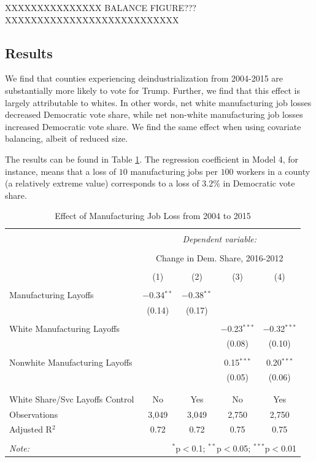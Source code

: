\documentclass[]{AEA}
\begin{document}
XXXXXXXXXXXXXXX BALANCE FIGURE??? XXXXXXXXXXXXXXXXXXXXXXXXXXX

\subsection{Results}

We find that counties experiencing deindustrialization from 2004-2015
are substantially more likely to vote for Trump. Further, we find that
this effect is largely attributable to whites. In other words, net white
manufacturing job losses decreased Democratic vote share, while net
non-white manufacturing job losses increased Democratic vote share. We
find the same effect when using covariate balancing, albeit of reduced
size.

The results can be found in Table \ref{regResult04}. The regression
coefficient in Model 4, for instance, means that a loss of \(10\)
manufacturing jobs per \(100\) workers in a county (a relatively extreme
value) corresponds to a loss of \(3.2 \%\) in Democratic vote share.

\begin{table}[!htbp] \centering 
  \caption{Effect of Manufacturing Job Loss from 2004 to 2015} 
  \label{regResult04} 
\begin{tabular}{@{\extracolsep{5pt}}lcccc} 
\\[-1.8ex]\hline 
\hline \\[-1.8ex] 
 & \multicolumn{4}{c}{\textit{Dependent variable:}} \\ 
\cline{2-5} 
\\[-1.8ex] & \multicolumn{4}{c}{Change in Dem. Share, 2016-2012} \\ 
\\[-1.8ex] & (1) & (2) & (3) & (4)\\ 
\hline \\[-1.8ex] 
 Manufacturing Layoffs & $-$0.34$^{**}$ & $-$0.38$^{**}$ &  &  \\ 
  & (0.14) & (0.17) &  &  \\ 
  & & & & \\ 
 White Manufacturing Layoffs &  &  & $-$0.23$^{***}$ & $-$0.32$^{***}$ \\ 
  &  &  & (0.08) & (0.10) \\ 
  & & & & \\ 
 Nonwhite Manufacturing Layoffs &  &  & 0.15$^{***}$ & 0.20$^{***}$ \\ 
  &  &  & (0.05) & (0.06) \\ 
  & & & & \\ 
\hline \\[-1.8ex] 
White Share/Svc Layoffs Control & No & Yes & No & Yes \\ 
Observations & 3,049 & 3,049 & 2,750 & 2,750 \\ 
Adjusted R$^{2}$ & 0.72 & 0.72 & 0.75 & 0.75 \\ 
\hline 
\hline \\[-1.8ex] 
\textit{Note:}  & \multicolumn{4}{r}{$^{*}$p$<$0.1; $^{**}$p$<$0.05; $^{***}$p$<$0.01} \\ 
\end{tabular} 
\end{table}
\end{document}

